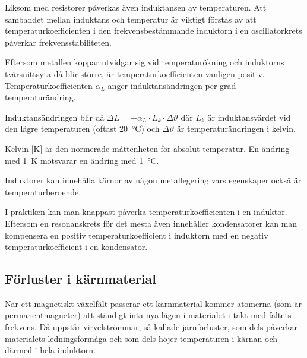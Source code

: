 Liksom med resistorer påverkas även induktansen av temperaturen.
Att sambandet mellan induktans och temperatur är viktigt förstås av att
temperaturkoefficienten i den frekvensbestämmande induktorn i en oscillatorkrets
påverkar frekvensstabiliteten.

Eftersom metallen koppar utvidgar sig vid temperaturökning och induktorns
tvärsnittsyta då blir större, är temperaturkoefficienten vanligen positiv.
Temperaturkoefficienten \(\alpha_L\) anger induktansändringen per grad
temperaturändring.

Induktansändringen blir då $\Delta L = \pm \alpha _L \cdot L_k \cdot \Delta\vartheta$
där \(L_k\) är induktansvärdet vid den lägre temperaturen (oftast
\qty{20}{\degreeCelsius}) och \(\Delta\vartheta\) är temperaturändringen i
kelvin.

Kelvin [K] är den normerade måttenheten för absolut temperatur.
En ändring med \qty{1}{\kelvin} motsvarar en ändring med \qty{1}{\degreeCelsius}.

Induktorer kan innehålla kärnor av någon metallegering vars egenskaper också är
temperaturberoende.

I praktiken kan man knappast påverka temperaturkoefficienten i en induktor.
Eftersom en resonanskrets för det mesta även innehåller kondensatorer kan
man kompensera en positiv temperaturkoefficient i induktorn med en negativ
temperaturkoefficient i en kondensator.

\subsection{Förluster i kärnmaterial}

När ett magnetiskt växelfält passerar ett kärnmaterial kommer atomerna (som
är permanentmagneter) att ständigt inta nya lägen i materialet i takt med
fältets frekvens.
Då uppstår virvelströmmar, så kallade järnförluster, som dels påverkar
materialets ledningsförmåga och som dels höjer temperaturen i kärnan och därmed
i hela induktorn.
